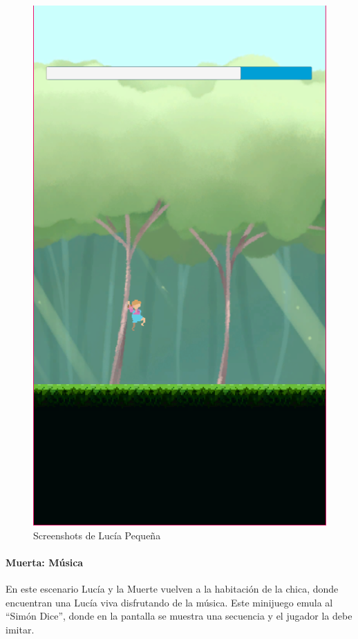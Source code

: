 \begin{figure}[h]
\begin{minipage}{0.45\textwidth}
\begin{flushright}
	   		\includegraphics[scale=.5]{imgs/screenshot10.png}
		\end{flushright}
	\end{minipage}
	\caption{Screenshots de Lucía Pequeña}
	\label{multifig:pequeña}
\end{figure}

\newpage
\paragraph{Muerta: Música}
En este escenario Lucía y la Muerte vuelven a la habitación de la chica, donde encuentran una Lucía viva disfrutando de la música.
Este minijuego emula al ``Simón Dice'', donde en la pantalla se muestra una secuencia y el jugador la debe imitar.

